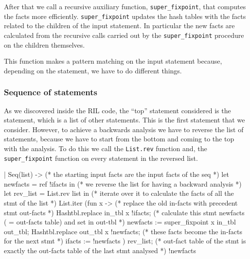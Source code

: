 \documentclass[a4paper]{article}   %
\begin{document}
After that we call a recursive auxiliary function, \texttt{super\_fixpoint}, that computes the facts more efficiently. 
\texttt{super\_fixpoint} updates the hash tables with the facts related to the children of the input statement. In particular the new facts are
%
calculated from the recursive calls carried out by the \texttt{super\_fixpoint} procedure on the children themselves.

This function makes a pattern matching on the input statement because, depending on the statement, we have to do different things.

\subsubsection{Sequence of statements}
As we discovered inside the RIL code, the ``top'' statement considered is the  statement, which is a list of other statements. %
This is the first statement that we consider. However, to achieve a backwards analysis we have to reverse the list of statements, because we have to start from the bottom and coming to the top with the analysis. 
To do this 
%
we call the \texttt{List.rev} function and, the \texttt{super\_fixpoint} function on every statement in the reversed list.

\begin{ocaml}
| Seq(list) -> 
	(* the starting input facts are the input facts of the seq *)
	let newfacts = ref !ifacts in
	(* we reverse the list for having a backward analysis *)
	let rev_list = List.rev list in
	(* iterate over it to calculate the facts of all the stmt of the list *)
  	List.iter (fun x -> 
  			(* replace the old in-facts with precedent stmt out-facts *)
  			Hashtbl.replace in_tbl x !ifacts; 
  	    	(* calculate this stmt newfacts ( = out-facts table) and set in out-tbl *)
  			newfacts := super_fixpoint x in_tbl out_tbl;
  			Hashtbl.replace out_tbl x !newfacts;
			(* these facts become the in-facts for the next stmt *)
  			ifacts := !newfacts
  	) rev_list;
	(* out-fact table of the stmt is exactly the out-facts table of the last stmt analysed *)
	!newfacts
\end{ocaml}
\end{document}
